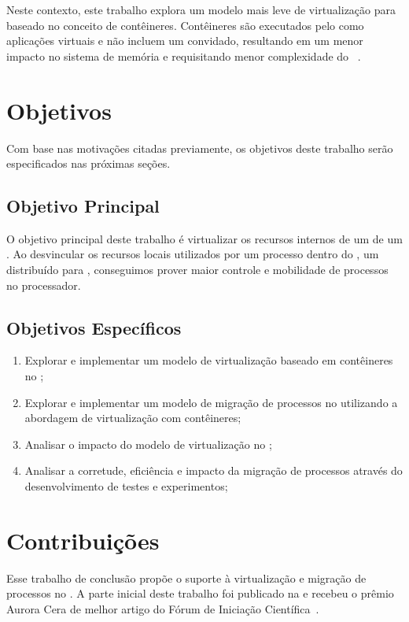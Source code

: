 Neste contexto, este trabalho explora um modelo mais leve de virtualização para \lws baseado no conceito de contêineres. Contêineres são executados pelo \os como aplicações virtuais e não incluem um \os convidado, resultando em um menor impacto no sistema de memória e requisitando menor complexidade do \hardware~\cite{thalheim2018cntr, sharma2016containers}.

\section{Objetivos}
\label{sec.goals}

Com base nas motivações citadas previamente, os objetivos deste trabalho serão especificados nas próximas seções.

\subsection{Objetivo Principal}
\label{sec.goals.primary}

O objetivo principal deste trabalho é virtualizar os recursos internos de um \cluster de um \lw. Ao desvincular os recursos locais utilizados por um processo dentro do \nanvix, um \os distribuído para \lws, conseguimos prover maior controle e mobilidade de processos no processador.

\subsection{Objetivos Específicos}
\label{sec.goals.secondary}

\begin{enumerate}[label= (\roman*)]
    \item Explorar e implementar um modelo de virtualização baseado em contêineres no \nanvix;
    \item Explorar e implementar um modelo de migração de processos no \nanvix utilizando a abordagem de virtualização com contêineres;
    \item Analisar o impacto do modelo de virtualização no \nanvix;
    \item Analisar a corretude, eficiência e impacto da migração de processos  através do desenvolvimento de testes e experimentos;
\end{enumerate}

\section{Contribuições}
Esse trabalho de conclusão propõe o suporte à virtualização e migração de processos no \nanvix. A parte inicial deste trabalho foi publicado na \erad e recebeu o prêmio Aurora Cera de melhor artigo do Fórum de Iniciação Científica~\cite{vanz2022virtualizaccao}.


